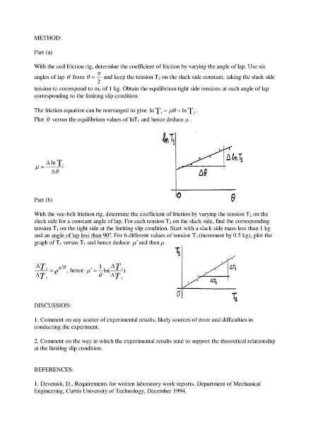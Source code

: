 \begin{figure}[H]
 \includegraphics[width=\linewidth]{lab2/lab2-2}
  \caption*{}
\label{}
\end{figure}
